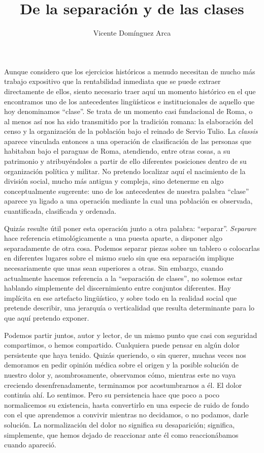 \documentclass[12pt,a4paper]{article}
\title{De la separación y de las clases}
\author{Vicente Domínguez Arca}
\date{}
\begin{document}
\maketitle

Aunque considero que los ejercicios históricos a menudo necesitan de mucho más trabajo expositivo que la rentabilidad inmediata que se puede extraer directamente de ellos, siento necesario traer aquí un momento histórico en el que encontramos uno de los antecedentes lingüísticos e institucionales de aquello que hoy denominamos \enquote{clase}. Se trata de un momento casi fundacional de Roma, o al menos así nos ha sido transmitido por la tradición romana: la elaboración del censo y la organización de la población bajo el reinado de Servio Tulio. La \textit{classis} aparece vinculada entonces a una operación de clasificación de las personas que habitaban bajo el paraguas de Roma, atendiendo, entre otras cosas, a su patrimonio y atribuyéndoles a partir de ello diferentes posiciones dentro de su organización política y militar. No pretendo localizar aquí el nacimiento de la división social, mucho más antigua y compleja, sino detenerme en algo conceptualmente sugerente: uno de los antecedentes de nuestra palabra \enquote{clase} aparece ya ligado a una operación mediante la cual una población es observada, cuantificada, clasificada y ordenada.

Quizás resulte útil poner esta operación junto a otra palabra: \enquote{separar}. \textit{Separare} hace referencia etimológicamente a una puesta aparte, a disponer algo separadamente de otra cosa. Podemos separar piezas sobre un tablero o colocarlas en diferentes lugares sobre el mismo suelo sin que esa separación implique necesariamente que unas sean superiores a otras. Sin embargo, cuando actualmente hacemos referencia a la \enquote{separación de clases}, no solemos estar hablando simplemente del discernimiento entre conjuntos diferentes. Hay implícita en ese artefacto lingüístico, y sobre todo en la realidad social que pretende describir, una jerarquía o verticalidad que resulta determinante para lo que aquí pretendo exponer.

Podemos partir juntos, autor y lector, de un mismo punto que casi con seguridad compartimos, o hemos compartido. Cualquiera puede pensar en algún dolor persistente que haya tenido. Quizás queriendo, o sin querer, muchas veces nos demoramos en pedir opinión médica sobre el origen y la posible solución de nuestro dolor y, asombrosamente, observamos cómo, mientras este no vaya creciendo desenfrenadamente, terminamos por acostumbrarnos a él. El dolor continúa ahí. Lo sentimos. Pero su persistencia hace que poco a poco normalicemos su existencia, hasta convertirlo en una especie de ruido de fondo con el que aprendemos a convivir mientras no decidamos, o no podamos, darle solución. La normalización del dolor no significa su desaparición; significa, simplemente, que hemos dejado de reaccionar ante él como reaccionábamos cuando apareció.
\end{document}

